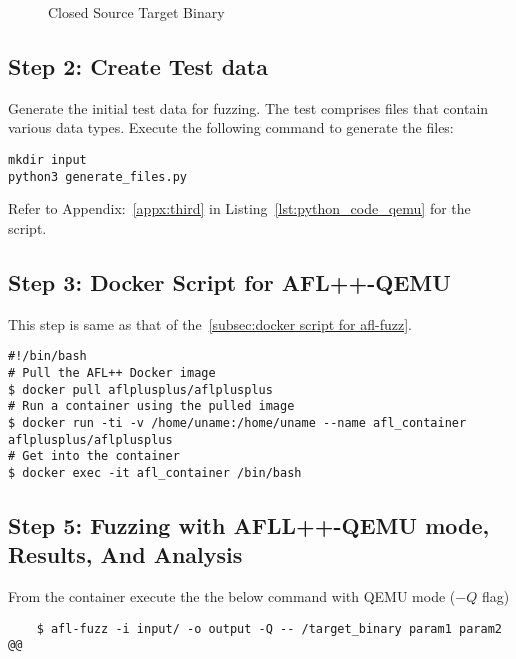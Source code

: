 \begin{figure}[H]
    \centering
    {}
    \caption{Closed Source Target Binary}\label{fig:simplified_closed_binaries}
\end{figure}

\subsection*{Step 2: Create Test data}
Generate the initial test data for fuzzing. The test comprises files that
contain various data types. Execute the following command to generate the files:

\begin{verbatim}
mkdir input
python3 generate_files.py
\end{verbatim}

Refer to Appendix:~\ref{appx:third} in Listing~\ref{lst:python_code_qemu} for the script.

\subsection*{Step 3: Docker Script for AFL++-QEMU}
This step is same as that of the~\ref{subsec:docker script for afl-fuzz}.

\begin{verbatim}
#!/bin/bash
# Pull the AFL++ Docker image
$ docker pull aflplusplus/aflplusplus
# Run a container using the pulled image
$ docker run -ti -v /home/uname:/home/uname --name afl_container aflplusplus/aflplusplus
# Get into the container
$ docker exec -it afl_container /bin/bash
\end{verbatim}

\subsection*{Step 5: Fuzzing with AFLL++-QEMU mode, Results, And Analysis}
From the container execute the the below command with
QEMU mode (\begin{math}-Q\end{math} flag)

\begin{verbatim}
    $ afl-fuzz -i input/ -o output -Q -- /target_binary param1 param2 @@
\end{verbatim}

